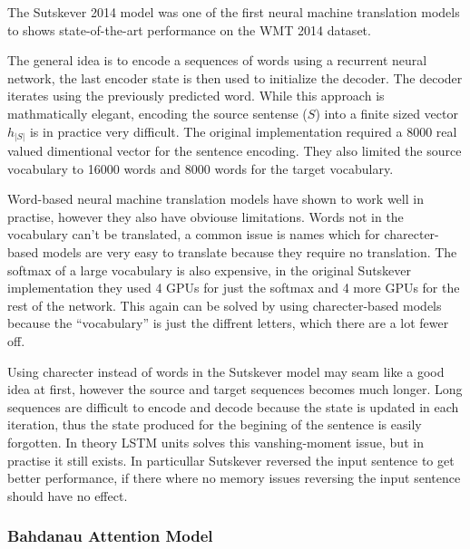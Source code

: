 The Sutskever 2014 model \cite{sutskever-2014-nmt} was one of the first neural machine translation models to shows state-of-the-art performance on the WMT 2014 dataset.

The general idea is to encode a sequences of words using a recurrent neural network, the last encoder state is then used to initialize the decoder. The decoder iterates using the previously predicted word. While this approach is mathmatically elegant, encoding the source sentense ($S$) into a finite sized vector $h_{|S|}$ is in practice very difficult. The original implementation required a 8000 real valued dimentional vector for the sentence encoding. They also limited the source vocabulary to 16000 words and 8000 words for the target vocabulary.

Word-based neural machine translation models have shown to work well in practise, however they also have obviouse limitations. Words not in the vocabulary can't be translated, a common issue is names which for charecter-based models are very easy to translate because they require no translation. The softmax of a large vocabulary is also expensive, in the original Sutskever implementation they used 4 GPUs for just the softmax and 4 more GPUs for the rest of the network. This again can be solved by using charecter-based models because the ``vocabulary'' is just the diffrent letters, which there are a lot fewer off.

Using charecter instead of words in the Sutskever model may seam like a good idea at first, however the source and target sequences becomes much longer. Long sequences are difficult to encode and decode because the state is updated in each iteration, thus the state produced for the begining of the sentence is easily forgotten. In theory LSTM units solves this vanshing-moment issue, but in practise it still exists. In particullar Sutskever reversed the input sentence to get better performance, if there where no memory issues reversing the input sentence should have no effect.

\subsubsection{Bahdanau Attention Model}

